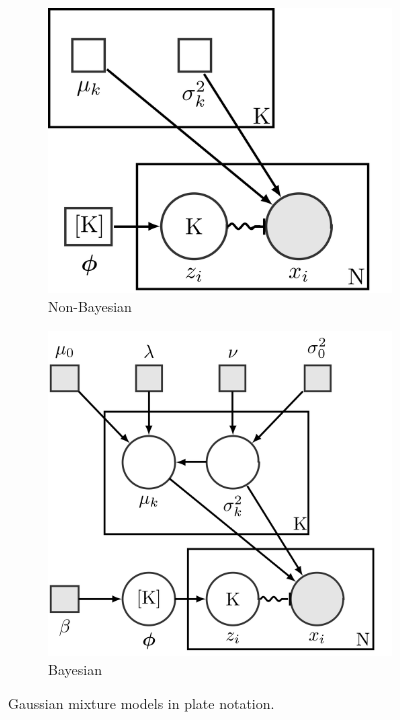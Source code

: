 \documentclass[conference]{IEEEtran}
\begin{document}
\begin{figure}[H]
    \centering
    \begin{subfigure}[b]{.4\linewidth}
        \centering
        \includegraphics[width=1\linewidth]{images/ComE/GMM.png}
        \caption{Non-Bayesian}
    \end{subfigure}%
    \begin{subfigure}[b]{.5\linewidth}
        \centering
        \includegraphics[width=1\linewidth]{images/ComE/BGMM.png}
        \caption{Bayesian}
    \end{subfigure}%
    \caption{Gaussian mixture models in plate notation\protect\footnotemark.}
    \label{fig:GMM_vs_BGMM_plates}
\end{figure}
\end{document}
